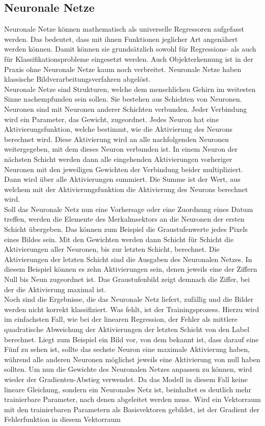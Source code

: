\subsection{Neuronale Netze}\label{subsec:Neuronale Netze}
    Neuronale Netze können mathematisch als universelle Regressoren aufgefasst werden\cite{Livshin2022}. Das bedeutet, dass mit ihnen Funktionen jeglicher Art angenähert werden können. Damit können sie grundsätzlich sowohl für Regressions- als auch für Klassifikationsprobleme eingesetzt werden. Auch Objekterkennung ist in der Praxis ohne Neuronale Netze kaum noch verbreitet. Neuronale Netze haben klassische Bildverarbeitungsverfahren abgelöst\cite{Pang2019-2}.\\ Neuronale Netze sind Strukturen, welche dem menschlichen Gehirn im weitesten Sinne nachempfunden sein sollen. Sie bestehen aus Schichten von Neuronen. Neuronen sind mit Neuronen anderer Schichten verbunden. Jeder Verbindung wird ein Parameter, das Gewicht, zugeordnet. Jedes Neuron hat eine Aktivierungsfunktion, welche bestimmt, wie die Aktivierung des Neurons berechnet wird. Diese Aktivierung wird an alle nachfolgenden Neuronen weitergegeben, mit dem dieses Neuron verbunden ist. In einem Neuron der nächsten Schicht werden dann alle eingehenden Aktivierungen vorheriger Neuronen mit den jeweiligen Gewichten der Verbindung beider multipliziert. Dann wird über alle Aktivierungen summiert. Die Summe ist der Wert, aus welchem mit der Aktivierungsfunktion die Aktivierung des Neurons berechnet wird\cite{Xia2019}.\\ Soll das Neuronale Netz nun eine Vorhersage oder eine Zuordnung eines Datum treffen, werden die Elemente des Merkalmsektors an die Neuronen der ersten Schicht übergeben. Das können zum Beispiel die Graustufenwerte jedes Pixels eines Bildes sein. Mit den Gewichten werden dann Schicht für Schicht die Aktivierungen aller Neuronen, bis zur letzten Schicht, berechnet. Die Aktivierungen der letzten Schicht sind die Ausgaben des Neuronalen Netzes. In diesem Beispiel können es zehn Aktivierungen sein, denen jeweils eine der Ziffern Null bis Neun zugeordnet ist. Das Graustufenbild zeigt demnach die Ziffer, bei der die Aktivierung maximal ist\cite{James2021-10}.\\ Noch sind die Ergebnisse, die das Neuronale Netz liefert, zufällig und die Bilder werden nicht korrekt klassifiziert. Was fehlt, ist der Trainingsprozess. Hierzu wird im einfachsten Fall, wie bei der linearen Regression, der Fehler als mittlere quadratische Abweichung der Aktivierungen der letzten Schicht von den Label berechnet. Liegt zum Beispiel ein Bild vor, von dem bekannt ist, dass darauf eine Fünf zu sehen ist, sollte das sechste Neuron eine maximale Aktivierung haben, während alle anderen Neuronen möglichst jeweils eine Aktivierung von null haben sollten. Um nun die Gewichte des Neuronalen Netzes anpassen zu können, wird wieder der Gradienten-Abstieg verwendet. Da das Modell in diesem Fall keine lineare Gleichung, sondern ein Neuronales Netz ist, beinhaltet es deutlich mehr trainierbare Parameter, nach denen abgeleitet werden muss. Wird ein Vektorraum mit den trainierbaren Parametern als Basisvektoren gebildet, ist der Gradient der Fehlerfunktion in diesem Vektorraum 